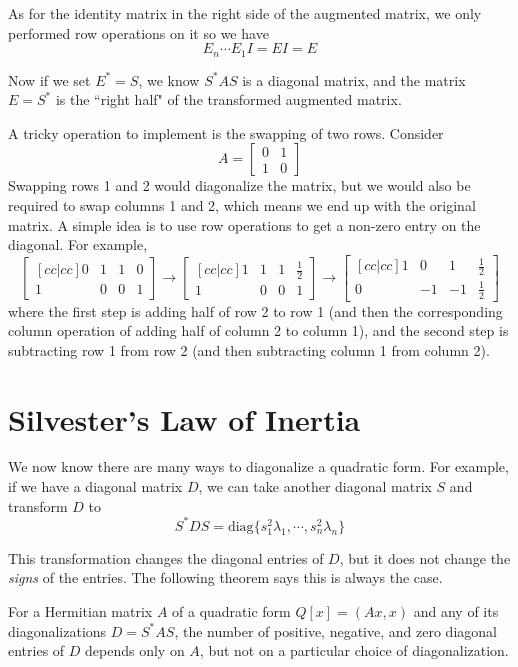 As for the identity matrix in the right side of the augmented matrix, we only performed row operations on it so we have 
$$E_{n} \cdots E_{1} I = EI = E$$

Now if we set $E^{*} = S$, we know $S^{*}AS$ is a diagonal matrix, and the matrix $E = S^{*}$ is the ``right half" of the transformed augmented matrix. 

A tricky operation to implement is the swapping of two rows. Consider 
$$A = \begin{bmatrix}
0 & 1 \\
1 & 0
\end{bmatrix}$$
Swapping rows 1 and 2 would diagonalize the matrix, but we would also be required to swap columns 1 and 2, which means we end up with the original matrix. A simple idea is to use row operations to get a non-zero entry on the diagonal. For example, 
$$\begin{bmatrix}[cc|cc]
0 & 1 & 1 & 0 \\
1 & 0 & 0 & 1
\end{bmatrix} \rightarrow \begin{bmatrix}[cc|cc] 
1 & 1 & 1 & \frac{1}{2} \\
1 & 0 & 0 & 1
\end{bmatrix} \rightarrow \begin{bmatrix}[cc|cc] 
1 & 0 & 1 & \frac{1}{2} \\
0 & -1 & -1 & \frac{1}{2}
\end{bmatrix}
$$
where the first step is adding half of row 2 to row 1 (and then the corresponding column operation of adding half of column 2 to column 1), and the second step is subtracting row 1 from row 2 (and then subtracting column 1 from column 2). 

\section{Silvester's Law of Inertia} 

We now know there are many ways to diagonalize a quadratic form. For example, if we have a diagonal matrix $D$, we can take another diagonal matrix $S$ and transform $D$ to 
$$S^{*} DS = \text{diag}\{ s_{1}^{2} \lambda_{1}, \cdots, s_{n}^{2} \lambda_{n} \}$$

This transformation changes the diagonal entries of $D$, but it does not change the \textit{signs} of the entries. The following theorem says this is always the case. 

\begin{theorem}
For a Hermitian matrix $A$ of a quadratic form $Q[x] = (Ax, x)$ and any of its diagonalizations $D = S^{*} AS$, the number of positive, negative, and zero diagonal entries of $D$ depends only on $A$, but not on a particular choice of diagonalization. 
\end{theorem}

